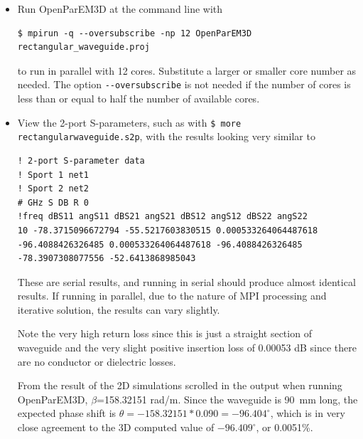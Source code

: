 \documentclass[titlepage]{article}
\renewcommand\_{\textunderscore\linebreak[1]}
\begin{document}
\begin{itemize}
\item Run OpenParEM3D at the command line with
\begin{Verbatim}[fontsize=\small]
   $ mpirun -q --oversubscribe -np 12 OpenParEM3D rectangular_waveguide.proj
\end{Verbatim}
to run in parallel with 12 cores.  Substitute a larger or smaller core number as needed.  The option \verb+--oversubscribe+ is not needed if the number of cores is less than or equal to half the number of available cores.
\item View the 2-port S-parameters, such as with \texttt{\$ more rectangular\_waveguide.s2p}, with the results looking very similar to 
\begin{Verbatim}[fontsize=\tiny]
! 2-port S-parameter data
! Sport 1 net1
! Sport 2 net2
# GHz S DB R 0
!freq dBS11 angS11 dBS21 angS21 dBS12 angS12 dBS22 angS22
10 -78.3715096672794 -55.5217603830515 0.000533264064487618 -96.4088426326485 0.000533264064487618 -96.4088426326485 -78.3907308077556 -52.6413868985043
\end{Verbatim}
These are serial results, and running in serial should produce almost identical results.  If running in parallel, due to the nature of MPI processing and iterative solution, the results can vary slightly.

Note the very high return loss since this is just a straight section of waveguide and the very slight positive insertion loss of 0.00053 dB since there are no conductor or dielectric losses.

From the result of the 2D simulations scrolled in the output when running OpenParEM3D, $\beta$=158.32151 rad/m.  Since the waveguide is 90~mm long, the expected phase shift is
 $\theta=-158.32151*0.090=-96.404^\circ$,
 which is in very close agreement to the 3D computed value of $-96.409^\circ$, or 0.0051\%.


\end{itemize}
\end{document}
